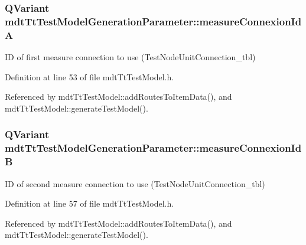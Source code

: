 \hypertarget{structmdt_tt_test_model_generation_parameter_a4b3fc18a0cb721b4cb7e945ce91469c7}{
\subsubsection[{measure\-Connexion\-Id\-A}]{\setlength{\rightskip}{0pt plus 5cm}Q\-Variant mdt\-Tt\-Test\-Model\-Generation\-Parameter\-::measure\-Connexion\-Id\-A}}\label{structmdt_tt_test_model_generation_parameter_a4b3fc18a0cb721b4cb7e945ce91469c7}


I\-D of first measure connection to use (Test\-Node\-Unit\-Connection\-\_\-tbl) 



Definition at line 53 of file mdt\-Tt\-Test\-Model.\-h.



Referenced by mdt\-Tt\-Test\-Model\-::add\-Routes\-To\-Item\-Data(), and mdt\-Tt\-Test\-Model\-::generate\-Test\-Model().

\hypertarget{structmdt_tt_test_model_generation_parameter_a0e4fba83adf5488dcc87d2ff1ee0edca}{
\subsubsection[{measure\-Connexion\-Id\-B}]{\setlength{\rightskip}{0pt plus 5cm}Q\-Variant mdt\-Tt\-Test\-Model\-Generation\-Parameter\-::measure\-Connexion\-Id\-B}}\label{structmdt_tt_test_model_generation_parameter_a0e4fba83adf5488dcc87d2ff1ee0edca}


I\-D of second measure connection to use (Test\-Node\-Unit\-Connection\-\_\-tbl) 



Definition at line 57 of file mdt\-Tt\-Test\-Model.\-h.



Referenced by mdt\-Tt\-Test\-Model\-::add\-Routes\-To\-Item\-Data(), and mdt\-Tt\-Test\-Model\-::generate\-Test\-Model().

